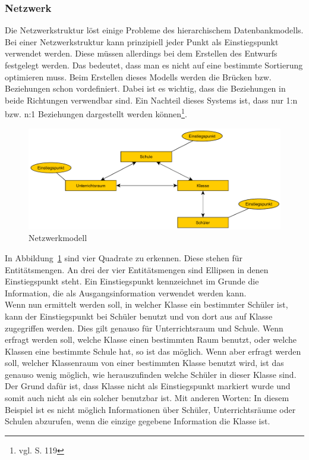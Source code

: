 \documentclass[a4paper, 12pt]{article}
\theoremstyle{plain}
\theoremstyle{definition}
\begin{document}
	\subsubsection{Netzwerk}
	\label{sec:netzdb}
	Die Netzwerkstruktur löst einige Probleme des hierarchischem Datenbankmodells. Bei einer Netzwerkstruktur kann prinzipiell jeder Punkt als Einstiegspunkt verwendet werden. Diese müssen allerdings bei dem Erstellen des Entwurfs festgelegt werden. Das bedeutet, dass man es nicht auf eine bestimmte Sortierung optimieren muss. Beim Erstellen dieses Modells werden die Brücken bzw. Beziehungen schon vordefiniert. Dabei ist es wichtig, dass die Beziehungen in beide Richtungen verwendbar sind. Ein Nachteil dieses Systems ist, dass nur 1:n bzw. n:1 Beziehungen dargestellt werden können\footnote{vgl. \cite{Jarosch2010} S. 119}. 
	
\begin{figure}[h]
\includegraphics[scale=1]{netzwerkmodell.pdf}	
\caption{Netzwerkmodell}\label{fig:netzwerkModell}
\end{figure}

In Abbildung~\ref{fig:netzwerkModell} sind vier Quadrate zu erkennen. Diese stehen für Entitätsmengen. An drei der vier Entitätsmengen sind Ellipsen in denen Einstiegspunkt steht. Ein Einstiegspunkt kennzeichnet im Grunde die Information, die als Ausgangsinformation verwendet werden kann. \\
Wenn nun ermittelt werden soll, in welcher Klasse ein bestimmter Schüler ist, kann der Einstiegspunkt bei Schüler benutzt und von dort aus auf Klasse zugegriffen werden. Dies gilt genauso für Unterrichtsraum und Schule. Wenn erfragt werden soll, welche Klasse einen bestimmten Raum benutzt, oder welche Klassen eine bestimmte Schule hat, so ist das möglich. Wenn aber erfragt werden soll, welcher Klassenraum von einer bestimmten Klasse benutzt wird, ist das genauso wenig möglich, wie herauszufinden welche Schüler in dieser Klasse sind. Der Grund dafür ist, dass Klasse nicht als Einstiegspunkt markiert wurde und somit auch nicht als ein solcher benutzbar ist. Mit anderen Worten: In diesem Beispiel ist es nicht möglich Informationen über Schüler, Unterrichtsräume oder Schulen abzurufen, wenn die einzige gegebene Information die Klasse ist.
		
\end{document}
